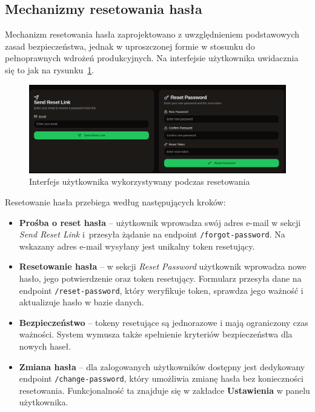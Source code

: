 \subsection{Mechanizmy resetowania hasła}

Mechanizm resetowania hasła zaprojektowano z uwzględnieniem podstawowych zasad bezpieczeństwa, jednak w uproszczonej formie w stosunku do pełnoprawnych wdrożeń produkcyjnych. Na interfejsie użytkownika uwidacznia się to jak na rysunku~\ref{fig:ui_password_reset}.
\begin{figure}[ht]
    \centering
    \includegraphics[width=0.95\linewidth]{rys03/pass_resert}
    \caption{Interfejs użytkownika wykorzystywany podczas resetowania}
    \label{fig:ui_password_reset}
\end{figure}

\noindent Resetowanie hasła przebiega według następujących kroków:
\begin{itemize}
    \item \textbf{Prośba o reset hasła} -- użytkownik wprowadza swój adres e-mail w sekcji \emph{Send Reset Link} i~przesyła żądanie na endpoint \texttt{/forgot-password}. Na wskazany adres e-mail wysyłany jest unikalny token resetujący.
    
    \item \textbf{Resetowanie hasła} -- w sekcji \emph{Reset Password} użytkownik wprowadza nowe hasło, jego potwierdzenie oraz token resetujący. Formularz przesyła dane na endpoint \texttt{/reset-password}, który weryfikuje token, sprawdza jego ważność i aktualizuje hasło w bazie danych.
    
    \item \textbf{Bezpieczeństwo} -- tokeny resetujące są jednorazowe i mają ograniczony czas ważności. System wymusza także spełnienie kryteriów bezpieczeństwa dla nowych haseł.
    
    \item \textbf{Zmiana hasła} -- dla zalogowanych użytkowników dostępny jest dedykowany endpoint \texttt{/change-password}, który umożliwia zmianę hasła bez konieczności resetowania. Funkcjonalność ta znajduje się w zakładce \textbf{Ustawienia} w panelu użytkownika.
\end{itemize}

